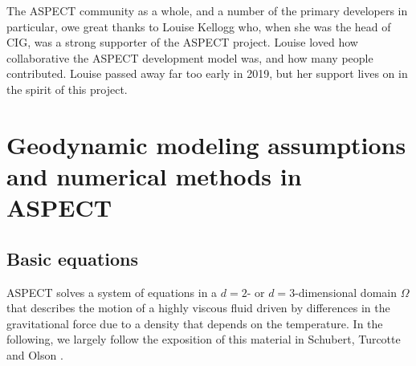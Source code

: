 \documentclass{article}
\newcommand{\aspect}{\textsc{ASPECT}}
\begin{document}
The \aspect{} community as a whole, and a number of the primary
developers in particular, owe great thanks to Louise Kellogg
who, when she was the head of CIG, was a strong supporter of the
\aspect{} project. Louise loved how collaborative the \aspect{}
development model was, and how many people contributed. Louise passed
away far too early in 2019, but her support lives on in the spirit of
this project.


\section{Geodynamic modeling assumptions and numerical methods in \aspect{}}
\label{sec:models}

\subsection{Basic equations}
\label{sec:equations}

\aspect{} solves a system of equations in a $d=2$- or $d=3$-dimensional
domain $\Omega$ that describes the motion of a highly viscous fluid driven
by differences in the gravitational force due to a density that depends on
the temperature. In the following, we largely follow the exposition of this
material in Schubert, Turcotte and Olson \cite{STO01}.
\end{document}
